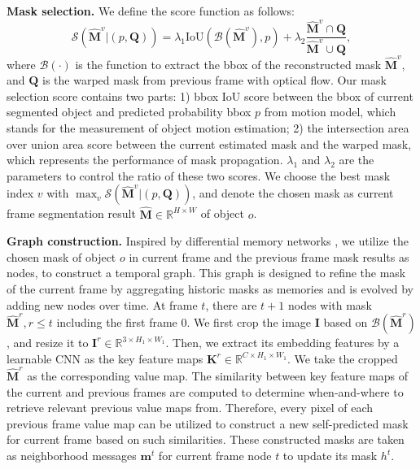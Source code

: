 \documentclass[letterpaper]{article} \usepackage{aaai21}  \usepackage{times}  \usepackage{helvet} \usepackage{courier}  \usepackage[hyphens]{url}  \usepackage{graphicx} \urlstyle{rm} \def\UrlFont{\rm}  \usepackage{graphicx}  \usepackage{natbib}  \usepackage{caption} \frenchspacing  \setlength{\pdfpagewidth}{8.5in}  \setlength{\pdfpageheight}{11in}  \usepackage{amsmath}
\begin{document}
\noindent \textbf{Mask selection.}
We define the score function as follows:
\begin{equation}
    \mathcal{S}(\widehat{\bm{M}}^{v}|(p,\bm{Q})) = \lambda_1 \text{IoU}(\mathcal{B}(\widehat{\bm{M}}^{v}), p) + \lambda_2 \frac{\widehat{\bm{M}}^{v} \cap \bm{Q}}{\widehat{\bm{M}}^{v} \cup \bm{Q}},
\label{eq:lambda}
\end{equation}
where $\mathcal{B}(\cdot)$ is the function to extract the bbox of the reconstructed mask $\widehat{\bm{M}}^{v}$, and $\bm{Q}$ is the warped mask from previous frame with optical flow. Our mask selection score contains two parts: 1) bbox IoU score between the bbox of current segmented object and predicted probability bbox $p$ from motion model, which stands for the measurement of object motion estimation; 2) the intersection area over union area score between the current estimated mask and the warped mask, which represents the performance of mask propagation. $\lambda_1$ and $\lambda_2$ are the parameters to control the ratio of these two scores. We choose the best mask index $v$ with $\max_{v} \mathcal{S}(\widehat{\bm{M}}^{v}|(p,\bm{Q}))$, and denote the chosen mask as current frame segmentation result $\widehat{\bm{M}} \in \mathbb{R}^{H\times W}$ of object $o$.

\noindent \textbf{Graph construction.}
Inspired by differential memory networks \cite{vaswani2017attention,sukhbaatar2015end}, we utilize the chosen mask of object $o$ in current frame and the previous frame mask results as nodes, to construct a temporal graph. This graph is designed to refine the mask of the current frame by aggregating historic masks as memories and is evolved by adding new nodes over time. At frame $t$, there are $t+1$ nodes with mask $\widehat{\bm{M}}^r,r\leq t$ including the first frame $0$. 
We first crop the image $\bm{I}$ based on $\mathcal{B}(\widehat{\bm{M}}^r)$, and resize it to $\bm{I}^r \in \mathbb{R}^{3 \times H_1 \times W_1}$. Then, we
extract its embedding features by a learnable CNN as the key feature maps $\bm{K}^r \in \mathbb{R}^{C \times H_1 \times W_1}$. We take the cropped $\widehat{\bm{M}}^r$ as the corresponding value map. 
The similarity between key feature maps of the current and previous frames are computed to determine when-and-where to retrieve relevant previous value maps from. Therefore, every pixel of each previous frame value map can be utilized to construct a new self-predicted mask for current frame based on such similarities. These constructed masks are taken as neighborhood messages $\bm{m}^t$ for current frame node $t$ to update its mask $h^t$. 
\end{document}
